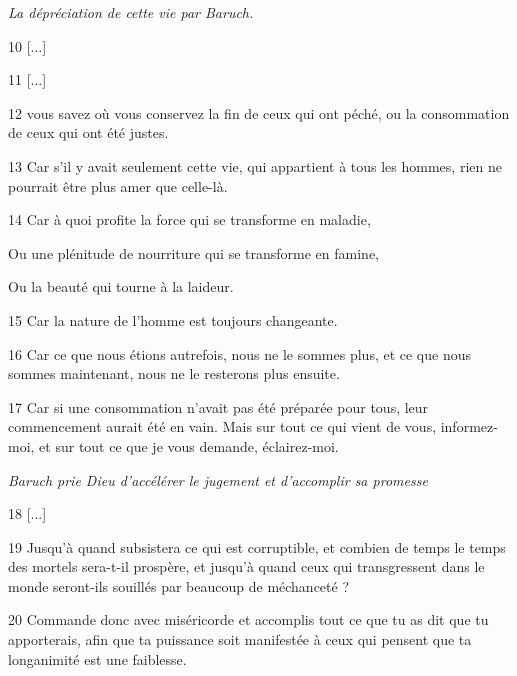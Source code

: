 \par \textit{La dépréciation de cette vie par Baruch.}

\par 10 [...]

\par 11 [...]

\par 12 vous savez où vous conservez la fin de ceux qui ont péché, ou la consommation de ceux qui ont été justes.

\par 13 Car s'il y avait seulement cette vie, qui appartient à tous les hommes, rien ne pourrait être plus amer que celle-là.

\par 14 Car à quoi profite la force qui se transforme en maladie,

\par Ou une plénitude de nourriture qui se transforme en famine,

\par Ou la beauté qui tourne à la laideur.

\par 15 Car la nature de l'homme est toujours changeante.

\par 16 Car ce que nous étions autrefois, nous ne le sommes plus, et ce que nous sommes maintenant, nous ne le resterons plus ensuite.

\par 17 Car si une consommation n'avait pas été préparée pour tous, leur commencement aurait été en vain. Mais sur tout ce qui vient de vous, informez-moi, et sur tout ce que je vous demande, éclairez-moi.

\par \textit{Baruch prie Dieu d'accélérer le jugement et d'accomplir sa promesse}

\par 18 [...]

\par 19 Jusqu'à quand subsistera ce qui est corruptible, et combien de temps le temps des mortels sera-t-il prospère, et jusqu'à quand ceux qui transgressent dans le monde seront-ils souillés par beaucoup de méchanceté ?

\par 20 Commande donc avec miséricorde et accomplis tout ce que tu as dit que tu apporterais, afin que ta puissance soit manifestée à ceux qui pensent que ta longanimité est une faiblesse.

